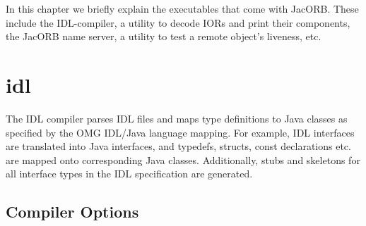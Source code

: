 %
%

In this chapter we  briefly explain the executables that come
with JacORB. These include the IDL-compiler, a utility to decode IORs
and print their components, the JacORB name server, a utility to test
a remote object's liveness, etc.

\section{idl}

The IDL compiler parses IDL files and maps type definitions to Java
classes as specified by the OMG IDL/Java language mapping. For
example, IDL interfaces are translated into Java interfaces, and
typedefs, structs, const declarations etc.  are mapped onto
corresponding Java classes. Additionally, stubs and skeletons for all
interface types in the IDL specification are generated.

\subsection*{Compiler Options}

